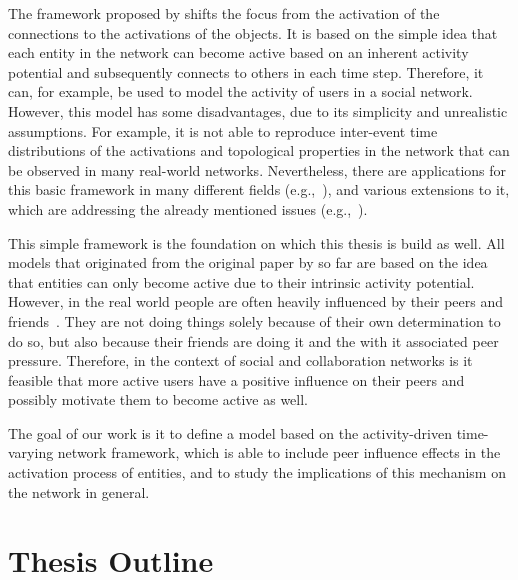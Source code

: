 The framework proposed by \citet{Perra2012a} shifts the focus from the activation of the connections to the activations of the objects.
It is based on the simple idea that each entity in the network can become active based on an inherent activity potential and subsequently connects to others in each time step.
Therefore, it can, for example, be used to model the activity of users in a social network.
However, this model has some disadvantages, due to its simplicity and unrealistic assumptions.
For example, it is not able to reproduce inter-event time distributions of the activations and topological properties in the network that can be observed in many real-world networks.
Nevertheless, there are applications for this basic framework in many different fields (e.g.,~\cite{Rizzo2014, Rizzo2016}), and various extensions to it, which are addressing the already mentioned issues (e.g.,~\cite{Laurent2015, Moinet2015, Moinet2016}).

This simple framework is the foundation on which this thesis is build as well.
All models that originated from the original paper by \citet{Perra2012a} so far are based on the idea that entities can only become active due to their intrinsic activity potential.
However, in the real world people are often heavily influenced by their peers and friends~\cite{Walk2016}.
They are not doing things solely because of their own determination to do so, but also because their friends are doing it and the with it associated peer pressure.
Therefore, in the context of social and collaboration networks is it feasible that more active users have a positive influence on their peers and possibly motivate them to become active as well.

The goal of our work is it to define a model based on the activity-driven time-varying network framework, which is able to include peer influence effects in the activation process of entities, and to study the implications of this mechanism on the network in general.




\section{Thesis Outline}
\label{sec:outline}

